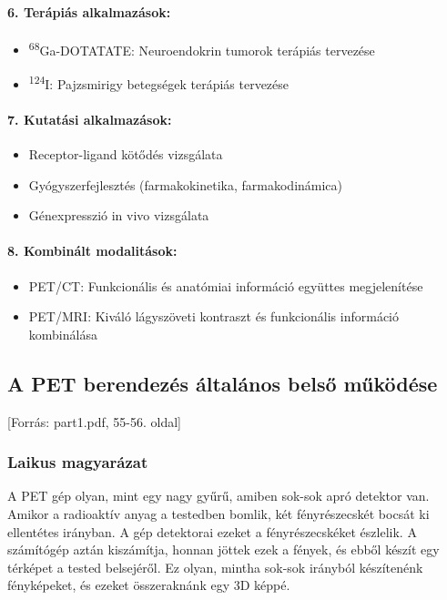 \documentclass[a4paper,12pt]{article}
\begin{document}
\paragraph{6. Terápiás alkalmazások:} \begin{itemize} \item \textsuperscript{68}Ga-DOTATATE: Neuroendokrin tumorok terápiás tervezése \item \textsuperscript{124}I: Pajzsmirigy betegségek terápiás tervezése \end{itemize}

\paragraph{7. Kutatási alkalmazások:} \begin{itemize} \item Receptor-ligand kötődés vizsgálata \item Gyógyszerfejlesztés (farmakokinetika, farmakodinámica) \item Génexpresszió in vivo vizsgálata \end{itemize}

\paragraph{8. Kombinált modalitások:} \begin{itemize} \item PET/CT: Funkcionális és anatómiai információ együttes megjelenítése \item PET/MRI: Kiváló lágyszöveti kontraszt és funkcionális információ kombinálása \end{itemize}

\subsection{A PET berendezés általános belső működése} [Forrás: part1.pdf, 55-56. oldal]

\subsubsection{Laikus magyarázat} A PET gép olyan, mint egy nagy gyűrű, amiben sok-sok apró detektor van. Amikor a radioaktív anyag a testedben bomlik, két fényrészecskét bocsát ki ellentétes irányban. A gép detektorai ezeket a fényrészecskéket észlelik. A számítógép aztán kiszámítja, honnan jöttek ezek a fények, és ebből készít egy térképet a tested belsejéről. Ez olyan, mintha sok-sok irányból készítenénk fényképeket, és ezeket összeraknánk egy 3D képpé.
\end{document}

